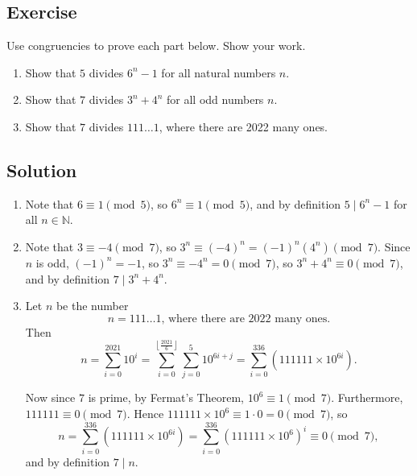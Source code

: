 \documentclass{article}
\newcounter{counter}
\newcommand{\Exercise}{Exercise \stepcounter{counter}\thecounter}
\begin{document}
\subsection*{\Exercise}
    Use congruencies to prove each part below. Show your work.
    \begin{enumerate}
        \item Show that $5$ divides $6^{n} - 1$ for all natural numbers $n$.
        \item Show that $7$ divides $3^{n} + 4^{n}$ for all odd numbers $n$.
        \item Show that $7$ divides $111\dots1$, where there are 2022 many ones.
    \end{enumerate}

\subsection*{Solution}
    \begin{enumerate}
        \item Note that $6 \equiv 1 \pmod{5}$, so $6^{n} \equiv 1 \pmod{5}$, and by definition $5 \mid 6^{n} - 1$ for all $n \in \mathbb{N}$.
        \item Note that $3 \equiv -4 \pmod{7}$, so $3^{n} \equiv (-4)^{n} = (-1)^{n}(4^{n}) \pmod{7}$. Since $n$ is odd, $(-1)^{n} = -1$, so $3^{n} \equiv -4^{n} = 0 \pmod{7}$, so $3^{n} + 4^{n} \equiv 0 \pmod{7}$, and by definition $7 \mid 3^{n} + 4^{n}$.
        \item Let $n$ be the number $$n = 111\dots 1\text{, where there are 2022 many ones}.$$ Then 
        \begin{equation*}
            n = \sum_{i = 0}^{2021} 10^{i} = \sum_{i = 0}^{\left\lfloor \frac{2021}{6} \right\rfloor} \sum_{j = 0}^{5} 10^{6i + j} = \sum_{i = 0}^{336} (111111 \times 10^{6i}).
        \end{equation*}
        
        Now since $7$ is prime, by Fermat's Theorem, $10^{6} \equiv 1 \pmod{7}$. Furthermore, $111111 \equiv 0 \pmod{7}$. Hence $111111 \times 10^{6} \equiv 1 \cdot 0 = 0 \pmod{7}$, so $$n = \sum_{i = 0}^{336} (111111 \times 10^{6i}) = \sum_{i = 0}^{336} (111111 \times 10^{6})^{i} \equiv 0 \pmod{7},$$ and by definition $7 \mid n$.
    \end{enumerate}
\end{document}
